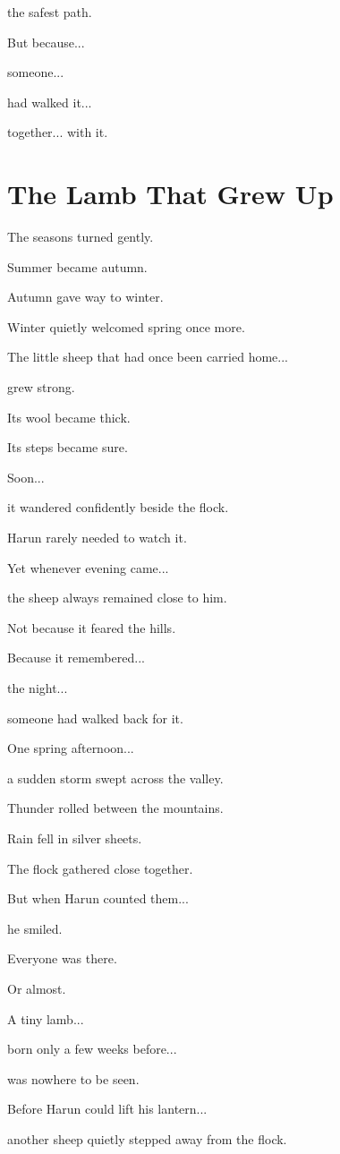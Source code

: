 \documentclass[12pt,openany]{book}
\begin{document}
the safest path.

But because...

someone...

had walked it...

together...
with it.
\section*{The Lamb That Grew Up}

The seasons turned gently.

Summer became autumn.

Autumn gave way to winter.

Winter quietly welcomed spring once more.

The little sheep that had once been carried home...

grew strong.

Its wool became thick.

Its steps became sure.

Soon...

it wandered confidently beside the flock.

Harun rarely needed to watch it.

Yet whenever evening came...

the sheep always remained close to him.

Not because it feared the hills.

Because it remembered...

the night...

someone had walked back for it.

One spring afternoon...

a sudden storm swept across the valley.

Thunder rolled between the mountains.

Rain fell in silver sheets.

The flock gathered close together.

But when Harun counted them...

he smiled.

Everyone was there.

Or almost.

A tiny lamb...

born only a few weeks before...

was nowhere to be seen.

Before Harun could lift his lantern...

another sheep quietly stepped away from the flock.
\end{document}
